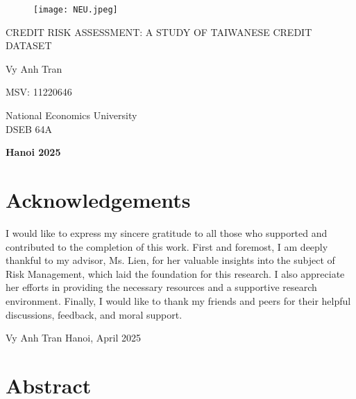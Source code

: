 \documentclass[a4paper,12pt]{article}
\begin{document}
\pagestyle{empty}

\begin{center}

\vspace*{0.5cm}

\begin{figure}[h!]
    \centering
    \texttt{[image: NEU.jpeg]}
    \label{fig:your_label}
\end{figure}


{\Large CREDIT RISK ASSESSMENT: A STUDY OF TAIWANESE CREDIT DATASET
\\
}

\vspace*{1.5cm}

{\large
Vy Anh Tran \\
}

{\large
MSV: 11220646 \\
}

\vspace*{2cm}
National Economics University\\
DSEB 64A \\

\vspace*{2cm}

{\bf Hanoi 2025}


\end{center}

\newpage

\section*{Acknowledgements}
I would like to express my sincere gratitude to all those who supported and contributed to the completion of this work. First and foremost, I am deeply thankful to my advisor, Ms. Lien, for her valuable insights into the subject of Risk Management, which laid the foundation for this research. I also appreciate her efforts in providing the necessary resources and a supportive research environment. Finally, I would like to thank my friends and peers for their helpful discussions, feedback, and moral support.

Vy Anh Tran\newline
Hanoi, April 2025

\newpage

\vspace*{-0.7cm}\section*{Abstract}
\end{document}
